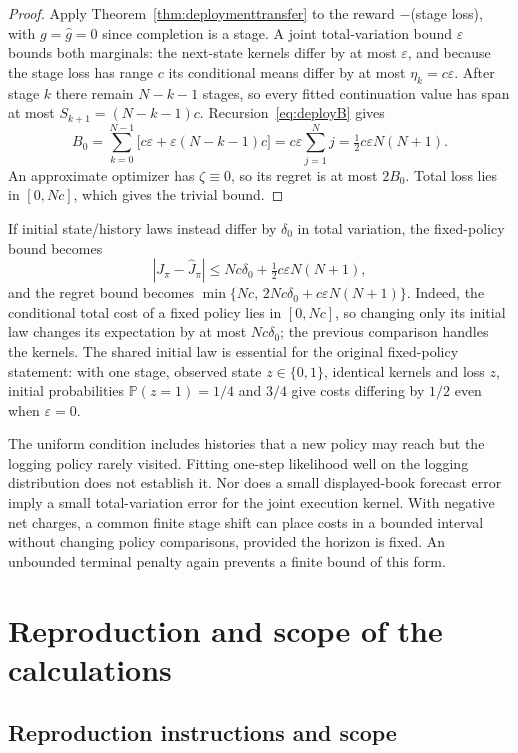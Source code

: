\documentclass[11pt]{article}
\numberwithin{equation}{section}
\theoremstyle{definition}
\theoremstyle{remark}
\theoremstyle{definition}
\newcommand{\Pp}{\mathbb P}
\begin{document}
\begin{proof}
Apply Theorem~\ref{thm:deploymenttransfer} to the reward $-$(stage loss), with
$g=\widehat g=0$ since completion is a stage. A joint total-variation bound
$\varepsilon$ bounds both marginals: the next-state kernels differ by at most
$\varepsilon$, and because the stage loss has range $c$ its conditional means
differ by at most $\eta_k=c\varepsilon$. After stage $k$ there remain
$N-k-1$ stages, so every fitted continuation value has span at most
$S_{k+1}=(N-k-1)c$. Recursion~\eqref{eq:deployB} gives
\[
  B_0=\sum_{k=0}^{N-1}\bigl[c\varepsilon+\varepsilon(N-k-1)c\bigr]
      =c\varepsilon\sum_{j=1}^{N}j=\tfrac12 c\varepsilon N(N+1).
\]
An approximate optimizer has $\zeta\equiv0$, so its regret is at most $2B_0$.
Total loss lies in $[0,Nc]$, which gives the trivial bound.
\end{proof}

If initial state/history laws instead differ by $\delta_0$ in total variation,
the fixed-policy bound becomes
\[
 |J_\pi-\widehat J_\pi|\leq
 Nc\delta_0+\tfrac12c\varepsilon N(N+1),
\]
and the regret bound becomes
$\min\{Nc,\,2Nc\delta_0+c\varepsilon N(N+1)\}$.
Indeed, the conditional total cost of a fixed policy lies in $[0,Nc]$, so
changing only its initial law changes its expectation by at most $Nc\delta_0$;
the previous comparison handles the kernels. The shared initial law is
essential for the original fixed-policy statement: with one stage, observed
state $z\in\{0,1\}$, identical kernels and loss $z$, initial probabilities
$\Pp(z=1)=1/4$ and $3/4$ give costs differing by $1/2$ even when
$\varepsilon=0$.

The uniform condition includes histories that a new policy may reach but
the logging policy rarely visited. Fitting one-step likelihood well on the
logging distribution does not establish it. Nor does a small displayed-book
forecast error imply a small total-variation error for the joint execution
kernel. With negative net charges, a common finite stage shift can place
costs in a bounded interval without changing policy comparisons, provided
the horizon is fixed. An unbounded terminal penalty again prevents a finite
bound of this form.

\section{Reproduction and scope of the calculations}\label{app:reproduction}

\subsection{Reproduction instructions and scope}
\end{document}
